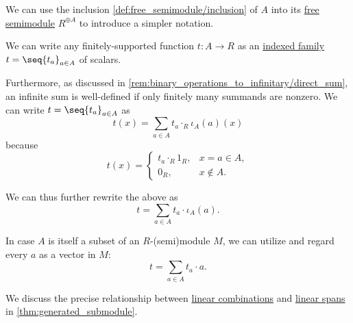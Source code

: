 \begin{remark}\label{rem:free_semimodule_notation}
  We can use the inclusion \cref{def:free_semimodule/inclusion} of \( A \) into its \hyperref[def:free_semimodule]{free semimodule} \( R^{\oplus A} \) to introduce a simpler notation.

  We can write any finitely-supported function \( t: A \to R \) as an \hyperref[def:indexed_family]{indexed family} \( t = \seq{ t_a }_{a \in A} \) of scalars.

  Furthermore, as discussed in \cref{rem:binary_operations_to_infinitary/direct_sum}, an infinite sum is well-defined if only finitely many summands are nonzero. We can write \( t = \seq{ t_a }_{a \in A} \) as
  \begin{equation*}
    t(x) = \sum_{a \in A} t_a \cdot_R \iota_A(a)(x)
  \end{equation*}
  because
  \begin{equation*}
    t(x) = \begin{cases}
      t_a \cdot_R 1_R, &x = a \in A, \\
      0_R,             &x \not\in A.
    \end{cases}
  \end{equation*}

  We can thus further rewrite the above as
  \begin{equation*}
    t = \sum_{a \in A} t_a \cdot \iota_A(a).
  \end{equation*}

  In case \( A \) is itself a subset of an \( R \)-(semi)module \( M \), we can utilize  and regard every \( a \) as a vector in \( M \):
  \begin{equation}\label{eq:def:free_semimodule/sum}
    t = \sum_{a \in A} t_a \cdot a.
  \end{equation}

  We discuss the precise relationship between \hyperref[def:linear_combination]{linear combinations} and \hyperref[def:linear_span]{linear spans} in \cref{thm:generated_submodule}.
\end{remark}


